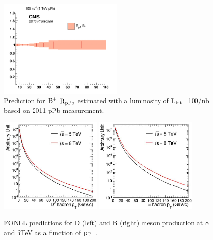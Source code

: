 \begin{figure}[h]
\begin{center}
\includegraphics[width= 0.55\textwidth]{figures/BpPbprediction.jpg}
\caption{Prediction for $\rm B^{+}$ $\rm R_{pPb}$ estimated with a luminosity of $\rm L_{int}$=100/nb based on 2011 pPb measurement.}
\label{fig:Bextrapolated}
\end{center}
\end{figure}


\begin{figure}[h]
\begin{center}
\includegraphics[width= 0.45\textwidth]{figures/D-Sigma.jpg}
\includegraphics[width= 0.45\textwidth]{figures/B-Sigma.jpg}
\caption{FONLL predictions for D (left) and B (right) meson production at 8 and 5TeV as a function of $\rm p_{T}$~\cite{FONLLcharmbottomPP1}.}
\label{fig:plotsDBpredictions}
\end{center}
\end{figure}
